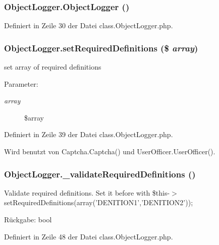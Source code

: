 \subsubsection{\setlength{\rightskip}{0pt plus 5cm}ObjectLogger.ObjectLogger ()}\label{classObjectLogger_51e1001bd0063f27980e825ff7fea920}




Definiert in Zeile 30 der Datei class.ObjectLogger.php.
\subsubsection{\setlength{\rightskip}{0pt plus 5cm}ObjectLogger.setRequiredDefinitions (\$ {\em array})}\label{classObjectLogger_32e3e4869d931bf1da2e2ce9e6a0ec4b}


set array of required definitions

\begin{Desc}
\item[Parameter:]
\begin{description}
\item[{\em array}]\$array \end{description}
\end{Desc}


Definiert in Zeile 39 der Datei class.ObjectLogger.php.

Wird benutzt von Captcha.Captcha() und UserOfficer.UserOfficer().
\subsubsection{\setlength{\rightskip}{0pt plus 5cm}ObjectLogger.\_\-validateRequiredDefinitions ()}\label{classObjectLogger_8db680194e6024d5a7e2db03d8d840e3}


Validate required definitions. Set it before with \$this-$>$setRequiredDefinitions(array('DENITION1','DENITION2'));

\begin{Desc}
\item[Rückgabe:]bool \end{Desc}


Definiert in Zeile 48 der Datei class.ObjectLogger.php.

